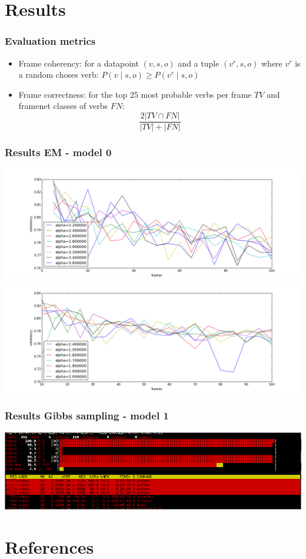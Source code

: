 \documentclass{beamer}
\begin{document}
\section{Results}

\begin{frame}
  \frametitle{Evaluation metrics}
  \begin{itemize}
  \item Frame coherency: for a datapoint $(v,s,o)$ and a tuple $(v^r,s,o)$ where $v^r$ is a random choses verb: $P(v\mid s,o) \geq P(v^r\mid s,o)$  
  \item Frame correctness: for the top 25 most probable verbs per frame $TV$ and framenet classes of verbs $FN$: \[\frac{2|TV\cap FN|}{|TV|+|FN|}\]
  \end{itemize}
\end{frame}

\begin{frame}
  \frametitle{Results EM - model 0}
  \includegraphics[width=\hsize,height=.4\vsize]{results_1}\\
  \includegraphics[width=\hsize,height=.4\vsize]{results_2}
\end{frame}

\begin{frame}
  \frametitle{Results Gibbs sampling - model 1}
  \includegraphics[width=\hsize]{bsy}\\
  
\end{frame}

\section{References}
\begin{frame}[t,allowframebreaks]
\nocite{*}

\end{frame}
\end{document}
